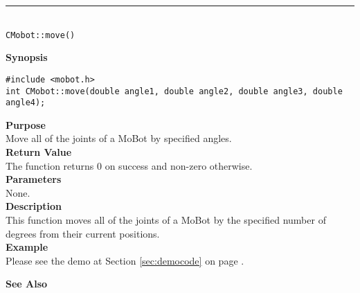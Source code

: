 \noindent
\vspace{5pt}
\rule{4.5in}{0.015in}\\
\noindent
{\LARGE \texttt{CMobot::move()}}\\
{}

\noindent
{\bf Synopsis}\\
\begin{verbatim}
#include <mobot.h>
int CMobot::move(double angle1, double angle2, double angle3, double angle4);
\end{verbatim}

\noindent
{\bf Purpose}\\
Move all of the joints of a MoBot by specified angles.\\

\noindent
{\bf Return Value}\\
The function returns 0 on success and non-zero otherwise.\\

\noindent
{\bf Parameters}\\
None.\\

\noindent
{\bf Description}\\
This function moves all of the joints of a MoBot by the specified number of degrees
from their current positions. \\

\noindent
{\bf Example}\\
Please see the demo at Section \ref{sec:democode} on page \pageref{sec:democode}.\\
\noindent

\noindent
{\bf See Also}\\

